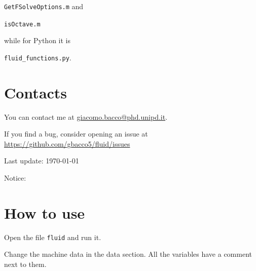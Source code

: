 \documentclass[b5paper,11pt,oneside,fleqn]{article}
\begin{document}
\texttt{GetFSolveOptions.m} and

\texttt{isOctave.m}


\noindent
while for Python it is


\texttt{fluid\_functions.py}.



\newpage

\section*{Contacts}
You can contact me at
\href{mailto:giacomo.bacco@phd.unipd.it}{giacomo.bacco@phd.unipd.it}.

If you find a bug, consider opening an issue at 
\url{https://github.com/gbacco5/fluid/issues}

\vfill
{\footnotesize\noindent  Last update: \today}

\vspace{3cm}
Notice:




\clearpage
\section{How to use}

Open the file \texttt{fluid} and run it.

Change the machine data in the data section.
All the variables have a comment next to them.
\end{document}

